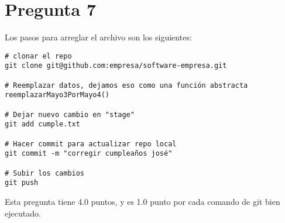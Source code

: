 \documentclass{article}
\begin{document}
\section*{Pregunta 7}
Los pasos para arreglar el archivo son los siguientes: 
\begin{verbatim}
# clonar el repo
git clone git@github.com:empresa/software-empresa.git

# Reemplazar datos, dejamos eso como una función abstracta
reemplazarMayo3PorMayo4()

# Dejar nuevo cambio en "stage"
git add cumple.txt

# Hacer commit para actualizar repo local
git commit -m "corregir cumpleaños josé"

# Subir los cambios
git push
\end{verbatim}

Esta pregunta tiene 4.0 puntos, y es 1.0 punto por cada comando de git bien ejecutado.
\end{document}
